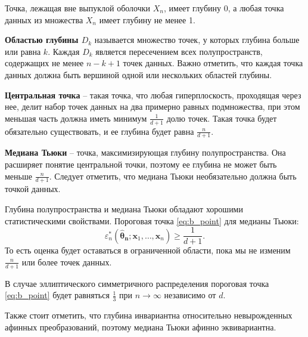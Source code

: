 \documentclass[specialist,
substylefile = spbu.rtx,
               subf,href,colorlinks=true, 12pt]{disser}
\begin{document}
Точка, лежащая вне выпуклой оболочки $X_n$, имеет глубину 0, а любая точка данных из множества $X_n$ имеет глубину не менее 1.

\textbf{Областью глубины $D_k$} \cite{Robust} называется множество точек, у которых глубина больше или равна $k$. Каждая $D_k$ является пересечением всех полупространств, содержащих не менее $n-k+1$ точек данных. Важно отметить, что каждая точка данных должна быть вершиной одной или нескольких областей глубины. 

\textbf{Центральная точка} \cite{Robust} -- такая точка, что любая гиперплоскость, проходящая через нее, делит набор точек данных на два примерно равных подмножества, при этом меньшая часть должна иметь минимум $\frac{1}{d+1}$ долю точек. Такая точка будет обязательно существовать, и ее глубина будет равна $\frac{n}{d+1}$.

 \textbf{Медиана Тьюки} \cite{Robust} -- точка, максимизирующая глубину полупространства. Она расширяет понятие центральной точки, поэтому ее глубина не может быть меньше $\frac{n}{d+1}$. Следует отметить, что медиана Тьюки необязательно должна быть точкой данных.

Глубина полупространства и медиана Тьюки обладают хорошими статистическими свойствами. Пороговая точка \ref{eq:b_point} для медианы Тьюки:
\[\varepsilon_n^*(\boldsymbol{\widehat {\theta}_n}; \mathbf{x}_1,\ldots, \mathbf{x}_n)\geqslant \frac{1}{d+1}.\]
То есть оценка будет оставаться в ограниченной области, пока мы не изменим $\frac{n}{d+1}$ или более точек данных.

В случае эллиптического симметричного распределения пороговая точка  \ref{eq:b_point} будет равняться $\frac{1}{3}$ при $n\to\infty$ независимо от $d$.

Также стоит отметить, что глубина инвариантна относительно невырожденных афинных преобразований, поэтому медиана Тьюки афинно эквивариантна. 
\end{document}
